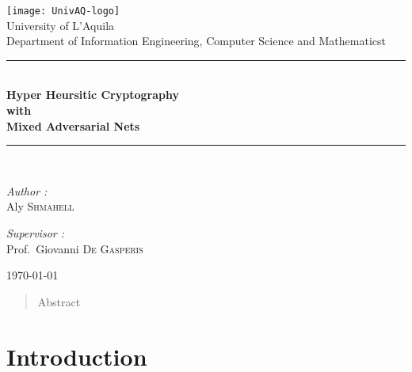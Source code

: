 \documentclass[12pt]{article}
\begin{document}
\begin{titlepage}
	\begin{center}
		\texttt{[image: UnivAQ-logo]}\\[1cm]
		{\large University of L'Aquila}\\[0.5cm]
		{\large Department of Information Engineering, Computer Science and Mathematicst}\\[0.5cm]
		\rule{\linewidth}{0.5mm} \\[0.4cm]
		{\huge \bfseries Hyper Heursitic Cryptography\\
			with\\
			Mixed Adversarial Nets \\[0.4cm] }
		\rule{\linewidth}{0.5mm} \\[1.5cm]
		\noindent
		\begin{minipage}{0.4\textwidth}
			\begin{flushleft}
				\large
				\emph{Author :}\\
				Aly \textsc{Shmahell}
			\end{flushleft}
		\end{minipage}%
		\begin{minipage}{0.4\textwidth}
			\begin{flushleft}
				\large
				\emph{Supervisor :} \\
				Prof.~Giovanni \textsc{De Gasperis}\\
			\end{flushleft}
		\end{minipage}
		\vfill
		\today
	\end{center}
\end{titlepage}
\begin{abstract}
Abstract
\end{abstract}
\newpage
\section{\textbf{Introduction}}\label{sec:introduction}
\end{document}
